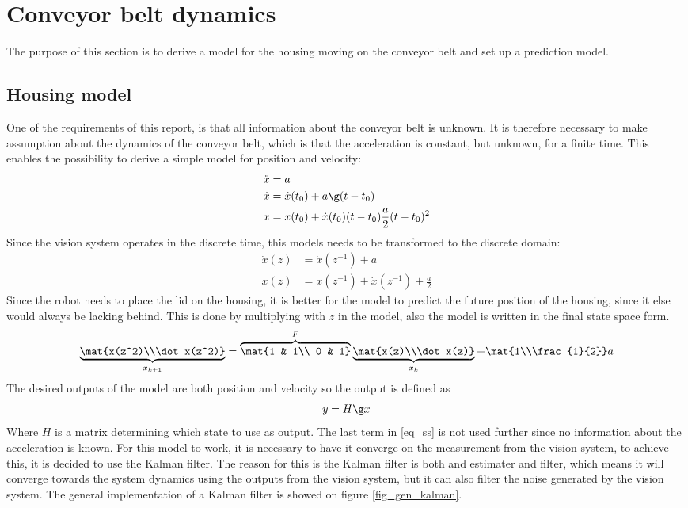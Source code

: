 \section{Conveyor belt dynamics}
The purpose of this section is to derive a model for the housing moving on the conveyor belt and set up a prediction model.
\subsection{Housing model}
One of the requirements of this report, is that all information about the conveyor belt is unknown. It is therefore necessary to make assumption about the dynamics of the conveyor belt, which is that the acceleration is constant, but unknown, for a  finite time. This enables the possibility to derive a simple model for position and velocity:
\begin{align}
\ddot x &= a \\
\dot x &= \dot x(t_0)+a\g(t-t_0)\\
x & = x(t_0)+\dot x(t_0)(t-t_0)\frac{a}{2}(t-t_0)^2
\end{align}
Since the vision system operates in the discrete time, this models needs to be transformed to the discrete domain:
\begin{align}
\dot x(z) &= \dot x(z^{-1})+a\\
x(z) & = x(z^{-1})+\dot x(z^{-1})+\frac{a}{2}
\end{align} 
Since the robot needs to place the lid on the housing, it is better for the model to predict the future position of the housing, since it else would always be lacking behind. This is done by multiplying with $z$ in the model, also the model is written in the final state space form.
\begin{equation}\label{eq_ss}
\underbrace{\mat{x(z^2)\\\dot x(z^2)}}_{x_{k+1}}=\overbrace{\mat{1 & 1\\ 0 & 1}}^F\underbrace{\mat{x(z)\\\dot x(z)}}_{x_k}+\mat{1\\\frac{1}{2}}a
\end{equation}
The desired outputs of the model are both position and velocity so the output is defined as
\begin{equation}
y = H\g x
\end{equation}
Where $H$ is a matrix determining which state to use as output. The last term in \eqref{eq_ss} is not used further since no information about the acceleration is known. For this model to work, it is necessary to have it converge on the measurement from the vision system, to achieve this, it is decided to use the Kalman filter. The reason for this is the Kalman filter is both and estimater and filter, which means it will converge towards the system dynamics using the outputs from the vision system, but it can also filter the noise generated by the vision system. The general implementation of a Kalman filter is showed on figure \ref{fig_gen_kalman}.\clearpage


